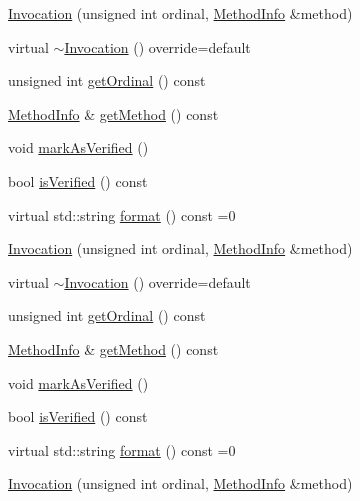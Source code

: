 \begin{DoxyCompactItemize}
\item 
\mbox{\hyperlink{structfakeit_1_1Invocation_a65e80c1f6eb1c04f7e6c48df5bd229a6}{Invocation}} (unsigned int ordinal, \mbox{\hyperlink{structfakeit_1_1MethodInfo}{Method\+Info}} \&method)
\item 
virtual \mbox{\hyperlink{structfakeit_1_1Invocation_a027b5d4605055387939c6e37cb01a427}{$\sim$\+Invocation}} () override=default
\item 
unsigned int \mbox{\hyperlink{structfakeit_1_1Invocation_a86b6f74924a9fed6b8760c2ba86a249b}{get\+Ordinal}} () const
\item 
\mbox{\hyperlink{structfakeit_1_1MethodInfo}{Method\+Info}} \& \mbox{\hyperlink{structfakeit_1_1Invocation_ae0b909794e14d6bba7db6baaef471865}{get\+Method}} () const
\item 
void \mbox{\hyperlink{structfakeit_1_1Invocation_a4579628568d7b469a1d225b3d43822e5}{mark\+As\+Verified}} ()
\item 
bool \mbox{\hyperlink{structfakeit_1_1Invocation_ae1c4e0840951bd5be209fd02196ecc59}{is\+Verified}} () const
\item 
virtual std\+::string \mbox{\hyperlink{structfakeit_1_1Invocation_ad6bf5d7b6ae2897c5d6bbb51183b8c1d}{format}} () const =0
\item 
\mbox{\hyperlink{structfakeit_1_1Invocation_a65e80c1f6eb1c04f7e6c48df5bd229a6}{Invocation}} (unsigned int ordinal, \mbox{\hyperlink{structfakeit_1_1MethodInfo}{Method\+Info}} \&method)
\item 
virtual \mbox{\hyperlink{structfakeit_1_1Invocation_a027b5d4605055387939c6e37cb01a427}{$\sim$\+Invocation}} () override=default
\item 
unsigned int \mbox{\hyperlink{structfakeit_1_1Invocation_a86b6f74924a9fed6b8760c2ba86a249b}{get\+Ordinal}} () const
\item 
\mbox{\hyperlink{structfakeit_1_1MethodInfo}{Method\+Info}} \& \mbox{\hyperlink{structfakeit_1_1Invocation_ae0b909794e14d6bba7db6baaef471865}{get\+Method}} () const
\item 
void \mbox{\hyperlink{structfakeit_1_1Invocation_a4579628568d7b469a1d225b3d43822e5}{mark\+As\+Verified}} ()
\item 
bool \mbox{\hyperlink{structfakeit_1_1Invocation_ae1c4e0840951bd5be209fd02196ecc59}{is\+Verified}} () const
\item 
virtual std\+::string \mbox{\hyperlink{structfakeit_1_1Invocation_ad6bf5d7b6ae2897c5d6bbb51183b8c1d}{format}} () const =0
\item 
\mbox{\hyperlink{structfakeit_1_1Invocation_a65e80c1f6eb1c04f7e6c48df5bd229a6}{Invocation}} (unsigned int ordinal, \mbox{\hyperlink{structfakeit_1_1MethodInfo}{Method\+Info}} \&method)

\end{DoxyCompactItemize}
